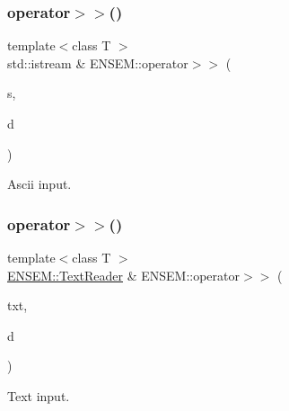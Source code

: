 \mbox{\label{group__rscalar_ga20742b8ba8dde3fd2bb81883ac983c5f}} 
\subsubsection{\texorpdfstring{operator$>$$>$()}{operator>>()}\hspace{0.1cm}{\footnotesize\ttfamily [1/3]}}
{\footnotesize\ttfamily template$<$class T $>$ \\
std\+::istream \& E\+N\+S\+E\+M\+::operator$>$$>$ (\begin{DoxyParamCaption}\item[{std\+::istream \&}]{s,  }\item[{\mbox{\hyperlink{classENSEM_1_1RScalar}{R\+Scalar}}$<$ T $>$ \&}]{d }\end{DoxyParamCaption})\hspace{0.3cm}{\ttfamily [inline]}}



Ascii input. 

\mbox{\label{group__rscalar_ga4ebc0db18feecd564535eb9b6011c854}} 
\subsubsection{\texorpdfstring{operator$>$$>$()}{operator>>()}\hspace{0.1cm}{\footnotesize\ttfamily [2/3]}}
{\footnotesize\ttfamily template$<$class T $>$ \\
\mbox{\hyperlink{classENSEM_1_1TextReader}{E\+N\+S\+E\+M\+::\+Text\+Reader}} \& E\+N\+S\+E\+M\+::operator$>$$>$ (\begin{DoxyParamCaption}\item[{\mbox{\hyperlink{classENSEM_1_1TextReader}{E\+N\+S\+E\+M\+::\+Text\+Reader}} \&}]{txt,  }\item[{\mbox{\hyperlink{classENSEM_1_1RScalar}{R\+Scalar}}$<$ T $>$ \&}]{d }\end{DoxyParamCaption})\hspace{0.3cm}{\ttfamily [inline]}}



Text input. 

